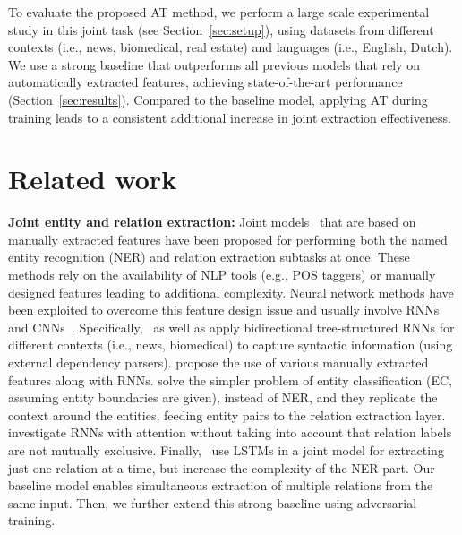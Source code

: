 \documentclass[11pt,a4paper]{article}
\newcommand{\eg}{e.g., }
\newcommand{\ie}{i.e., }
\newcommand{\secref}[1]{Section~\ref{#1}}
\begin{document}
To evaluate the proposed AT method, we perform a large scale experimental study in this joint task (see \secref{sec:setup}), using datasets from different contexts (\ie news, biomedical, real estate) and languages (\ie English, Dutch). 
We use a strong baseline that outperforms all previous models that rely on automatically extracted features, achieving state-of-the-art performance (\secref{sec:results}).
Compared to the baseline model, applying AT during training leads to a consistent additional increase in joint extraction effectiveness.

\section{Related work}

\label{sec:related_work}


\textbf{Joint entity and relation extraction:} Joint models~\citep{li:14,miwa:14} that are based on manually extracted features have been proposed for performing both the named entity recognition (NER) and relation extraction subtasks at once. These methods rely on the availability of NLP tools (\eg POS taggers) or manually designed features leading to additional complexity. Neural network methods have been exploited to overcome this feature design issue and usually involve RNNs and CNNs~\citep{miwa:16,zheng:17}. 
Specifically,~ as well as  apply
bidirectional tree-structured RNNs for different contexts (\ie news, biomedical) to capture syntactic information (using external dependency parsers). 
 propose the use of various manually extracted features along with RNNs.  solve the simpler problem of entity classification (EC, assuming entity boundaries are given), instead of NER, and they replicate the context around the entities, feeding entity pairs to the relation extraction layer.
 investigate RNNs with attention without taking into account that relation labels are not mutually exclusive.
Finally,~ use LSTMs in a joint model for extracting just one relation at a time, but increase the complexity of the NER part.
Our baseline model enables simultaneous extraction of multiple relations from the same input. Then, we further extend this strong baseline using adversarial training.
\end{document}
